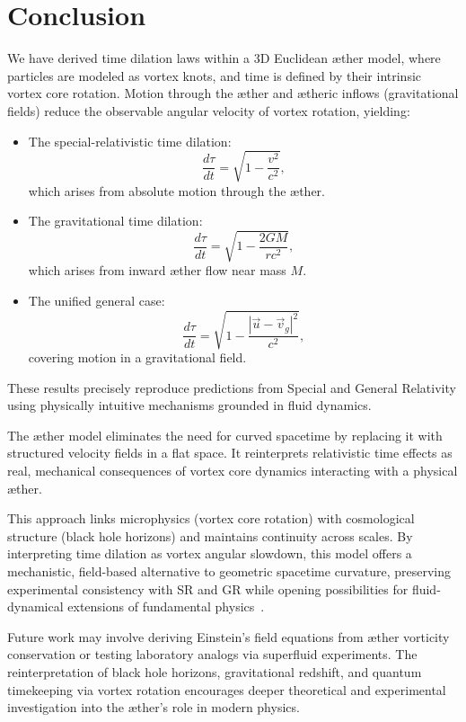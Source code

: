 
\section{Conclusion}

We have derived time dilation laws within a 3D Euclidean æther model, where particles are modeled as vortex knots, and time is defined by their intrinsic vortex core rotation. Motion through the æther and ætheric inflows (gravitational fields) reduce the observable angular velocity of vortex rotation, yielding:

\begin{itemize}
    \item The special-relativistic time dilation:
    \[
    \frac{d\tau}{dt} = \sqrt{1 - \frac{v^2}{c^2}},
    \]
    which arises from absolute motion through the æther.
    
    \item The gravitational time dilation:
    \[
    \frac{d\tau}{dt} = \sqrt{1 - \frac{2GM}{rc^2}},
    \]
    which arises from inward æther flow near mass $M$.
    
    \item The unified general case:
    \[
    \frac{d\tau}{dt} = \sqrt{1 - \frac{|\vec{u} - \vec{v}_g|^2}{c^2}},
    \]
    covering motion in a gravitational field.
\end{itemize}

These results precisely reproduce predictions from Special and General Relativity using physically intuitive mechanisms grounded in fluid dynamics.

The æther model eliminates the need for curved spacetime by replacing it with structured velocity fields in a flat space. It reinterprets relativistic time effects as real, mechanical consequences of vortex core dynamics interacting with a physical æther. 

This approach links microphysics (vortex core rotation) with cosmological structure (black hole horizons) and maintains continuity across scales. By interpreting time dilation as vortex angular slowdown, this model offers a mechanistic, field-based alternative to geometric spacetime curvature, preserving experimental consistency with SR and GR while opening possibilities for fluid-dynamical extensions of fundamental physics~\cite{Winterberg2002-PlanckAether,Schiller2022-maxforce}.

Future work may involve deriving Einstein’s field equations from æther vorticity conservation or testing laboratory analogs via superfluid experiments. The reinterpretation of black hole horizons, gravitational redshift, and quantum timekeeping via vortex rotation encourages deeper theoretical and experimental investigation into the æther’s role in modern physics.

